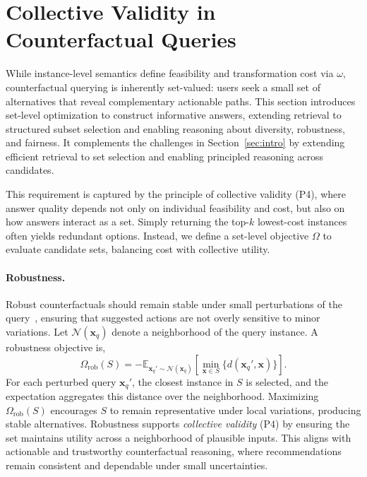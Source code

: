 \section{Collective Validity in Counterfactual Queries}
\label{sec:set}

While instance-level semantics define feasibility and transformation cost via $\omega$, counterfactual querying is inherently set-valued: users seek a small set of alternatives that reveal complementary actionable paths. This section introduces set-level optimization to construct informative answers, extending retrieval to structured subset selection and enabling reasoning about diversity, robustness, and fairness. It complements the challenges in Section~\ref{sec:intro} by extending efficient retrieval to set selection and enabling principled reasoning across candidates.

This requirement is captured by the principle of collective validity (P4), where answer quality depends not only on individual feasibility and cost, but also on how answers interact as a set. Simply returning the top-$k$ lowest-cost instances often yields redundant options. Instead, we define a set-level objective $\Omega$ to evaluate candidate sets, balancing cost with collective utility.

\paragraph{Robustness.}
Robust counterfactuals should remain stable under small perturbations of the query~\cite{guyomard2023generating}, ensuring that suggested actions are not overly sensitive to minor variations. Let $\mathcal N(\mathbf{x}_q)$ denote a neighborhood of the query instance. A robustness objective is,
\begingroup\small
\begin{equation}
\Omega_{\text{rob}}(S) = -\mathbb E_{\mathbf{x}_q'\sim\mathcal N(\mathbf{x}_q)} \left[ \min_{\mathbf{x}\in S} \{d(\mathbf{x}_q',\mathbf{x})\} \right].
\end{equation}
\endgroup
For each perturbed query $\mathbf{x}_q'$, the closest instance in $S$ is selected, and the expectation aggregates this distance over the neighborhood. Maximizing $\Omega_{\text{rob}}(S)$ encourages $S$ to remain representative under local variations, producing stable alternatives. Robustness supports \emph{collective validity} (P4) by ensuring the set maintains utility across a neighborhood of plausible inputs. This aligns with actionable and trustworthy counterfactual reasoning, where recommendations remain consistent and dependable under small uncertainties.

